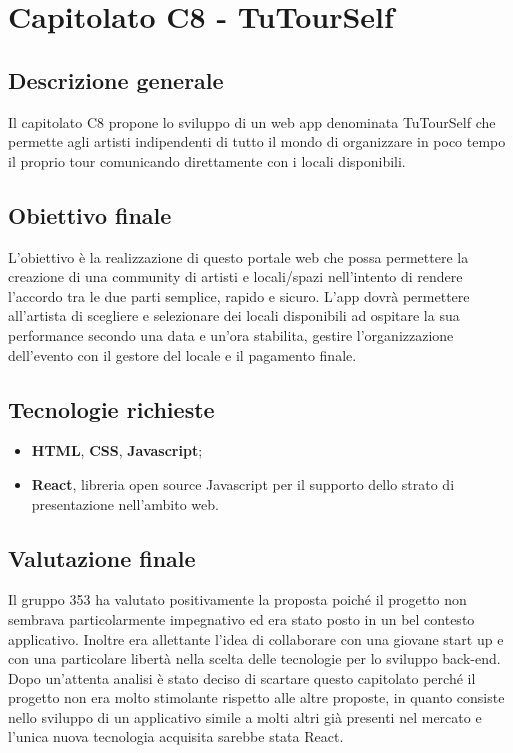 \documentclass[main.tex]{subfiles}
\begin{document}
\chapter{Capitolato C8 - TuTourSelf}
\section{Descrizione generale}
Il capitolato C8 propone lo sviluppo di un web app denominata TuTourSelf che permette agli artisti indipendenti di tutto il mondo di organizzare in poco tempo il proprio tour comunicando direttamente con i locali disponibili.
\section{Obiettivo finale}
L’obiettivo è la realizzazione di questo portale web che possa permettere la creazione di una community di artisti e locali/spazi nell’intento di rendere l’accordo tra le due parti semplice, rapido e sicuro. L’app dovrà permettere all’artista di scegliere e selezionare dei locali disponibili ad ospitare la sua performance secondo una data e un’ora stabilita, gestire l’organizzazione dell’evento con il gestore del locale e il pagamento finale.
\section{Tecnologie richieste}
\begin{itemize}
	\item \textbf{HTML}, \textbf{CSS}, \textbf{Javascript};
	\item \textbf{React}, libreria open source Javascript per il supporto dello strato di presentazione nell'ambito web.
\end{itemize}
\section{Valutazione finale}
Il gruppo 353 ha valutato positivamente la proposta poiché il progetto non sembrava particolarmente impegnativo ed era stato posto in un bel contesto applicativo. Inoltre era allettante l’idea di collaborare con una giovane start up e con una particolare libertà nella scelta delle tecnologie per lo sviluppo back-end.
Dopo un’attenta analisi è stato deciso di scartare questo capitolato perché il progetto non era molto stimolante rispetto alle altre proposte, in quanto consiste nello sviluppo di un applicativo simile a molti altri già presenti nel mercato e l’unica nuova tecnologia acquisita sarebbe stata React.
\end{document}

